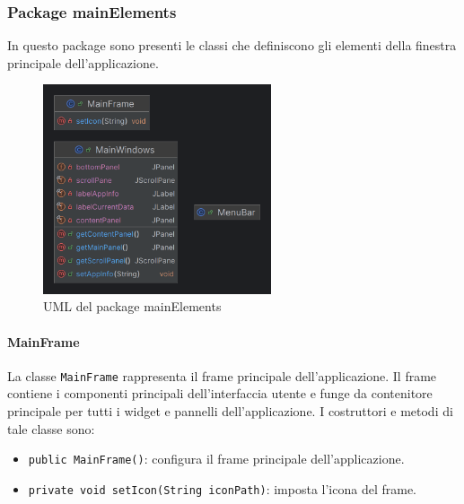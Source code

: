 \subsubsection {Package mainElements}
In questo package sono presenti le classi che definiscono gli elementi della finestra principale dell'applicazione.

\begin{figure}[H]
    \centering
    \includegraphics[width=0.6\textwidth]{img/mainElementsPackage.png}
    \caption{UML del package mainElements}
    \label{fig:UMLMainElements}
\end{figure}

\paragraph{MainFrame}
La classe \texttt{MainFrame} rappresenta il frame principale dell'applicazione.
Il frame contiene i componenti principali dell'interfaccia utente e funge da contenitore principale per tutti i widget e pannelli dell'applicazione.
I costruttori e metodi di tale classe sono:
\begin{itemize}
    \item \texttt{public MainFrame()}: configura il frame principale dell'applicazione.
    \item \texttt{private void setIcon(String iconPath)}: imposta l'icona del frame.
\end{itemize}

